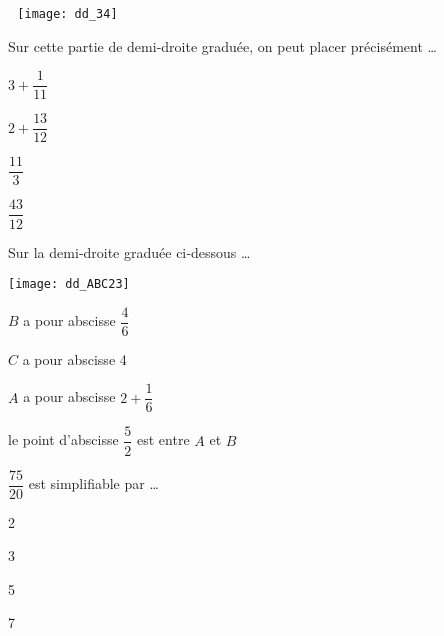 \begin{QCM}
\begin{GroupeQCM}
    
    \begin{exercice}
    
      \,\, \qquad \qquad \texttt{[image: dd\_34]}
      
      Sur cette partie de demi‑droite graduée, on peut placer précisément \ldots
      \begin{ChoixQCM}{4}
      \item $3 + \dfrac{1}{11}$
      \item $2 + \dfrac{13}{12}$
      \item $\dfrac{11}{3}$
      \item $\dfrac{43}{12}$
      \end{ChoixQCM}
\begin{corrige}
   \end{corrige}
    \end{exercice}
 

    \begin{exercice}
      Sur la demi‑droite graduée ci‑dessous \ldots
      
      \qquad \qquad \texttt{[image: dd\_ABC23]}
      \begin{ChoixQCM}{4}
      \item $B$ a pour abscisse $\dfrac{4}{6}$
      \item $C$ a pour abscisse 4
      \item $A$ a pour abscisse \newline $2 + \dfrac{1}{6}$
      \item le point d'abscisse $\dfrac{5}{2}$ est entre $A$ et $B$
      \end{ChoixQCM}
\begin{corrige}
   \end{corrige}
    \end{exercice}
    
    
    \begin{exercice}
      $\dfrac{75}{20}$ est simplifiable par \ldots
      \begin{ChoixQCM}{4}
      \item 2
      \item 3
      \item 5
      \item 7
      \end{ChoixQCM}
\begin{corrige}
   \end{corrige}
    \end{exercice}



\end{GroupeQCM}
\end{QCM}
